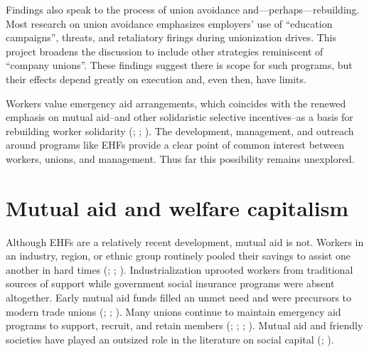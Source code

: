 \documentclass[
  11pt,
  oneside]{article}
\begin{document}
Findings also speak to the process of union avoidance and---perhaps---rebuilding. Most research on union avoidance emphasizes employers' use of ``education campaigns'', threats, and retaliatory firings during unionization drives. This project broadens the discussion to include other strategies reminiscent of ``company unions''. These findings suggest there is scope for such programs, but their effects depend greatly on execution and, even then, have limits.

Workers value emergency aid arrangements, which coincides with the renewed emphasis on mutual aid--and other solidaristic selective incentives--as a basis for rebuilding worker solidarity (; ; ). The development, management, and outreach around programs like EHFs provide a clear point of common interest between workers, unions, and management. Thus far this possibility remains unexplored.

\section{Mutual aid and welfare capitalism}\label{mutual-aid-and-welfare-capitalism}

Although EHFs are a relatively recent development, mutual aid is not. Workers in an industry, region, or ethnic group routinely pooled their savings to assist one another in hard times (; ; ). Industrialization uprooted workers from traditional sources of support while government social insurance programs were absent altogether. Early mutual aid funds filled an unmet need and were precursors to modern trade unions (; ; ). Many unions continue to maintain emergency aid programs to support, recruit, and retain members (; ; ; ). Mutual aid and friendly societies have played an outsized role in the literature on social capital (; ).
\end{document}
